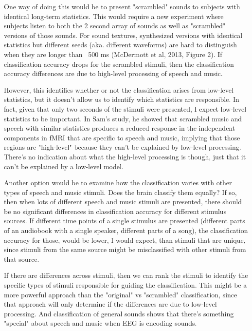\documentclass[11pt]{article}
\begin{document}
One way of doing this would be to present "scrambled" sounds to subjects with identical long-term statistics.  This would require a new experiment where subjects listen to both the 2 second array of sounds as well as "scrambled" versions of those sounds.  For sound textures, synthesized versions with identical statistics but different seeds (aka. different waveforms) are hard to distinguish when they are longer than ~500 ms (McDermott et al, 2013, Figure 2).  If classification accuracy drops for the scrambled stimuli, then the classification accuracy differences are due to high-level processing of speech and music.

However, this identifies whether or not the classification arises from low-level statistics, but it doesn't allow us to identify which statistics are responsible.  In fact, given that only two seconds of the stimuli were presented, I expect low-level statistics to be important.  In Sam's study, he showed that scrambled music and speech with similar statistics produces a reduced response in the independent components in fMRI that are specific to speech and music, implying that those regions are "high-level" because they can't be explained by low-level processing.  There's no indication about what the high-level processing is though, just that it can't be explained by a low-level model.

Another option would be to examine how the classification varies with other types of speech and music stimuli.  Does the brain classify them equally?  If so, then when lots of different speech and music stimuli are presented, there should be no significant differences in classification accuracy for different stimulus sources.  If different time points of a single stimulus are presented (different parts of an audiobook with a single speaker, different parts of a song), the classification accuracy for those, would be lower, I would expect, than stimuli that are unique, since stimuli from the same source might be misclassified with other stimuli from that source.

If there are differences across stimuli, then we can rank the stimuli to identify the specific types of stimuli responsible for guiding the classification.  This might be a more powerful approach than the "original" vs "scrambled" classification, since that approach will only determine if the differences are due to low-level processing.  And classification of general sounds shows that there's something "special" about speech and music when EEG is encoding sounds.
\end{document}
